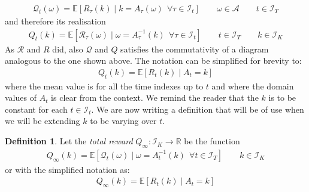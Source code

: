 \documentclass[]{scrartcl}
\theoremstyle{definition}
\newtheorem{definition}{Definition}[section]
\begin{document}
\begin{align}\label{def:mathcalQt}
\mathcal{Q}_t(\omega) = \mathbb{E} \left[ R_{\tau}(k)\mid k = A_{\tau}(\omega)~~ \forall \tau \in \mathcal{I}_t \right]
\qquad
\omega \in \mathcal{A}
\qquad
t \in \mathcal{I}_T
\end{align}
and therefore its realisation
\begin{align}\label{def:Qt}
Q_t(k) = \mathbb{E} \left[ \mathcal{R}_{\tau}(\omega)\mid \omega = A_{\tau}^{-1}(k)~~ \forall \tau \in \mathcal{I}_t \right]
\qquad
t \in \mathcal{I}_T
\qquad
k \in \mathcal{I}_K
\end{align}
As $\mathcal{R}$ and $R$ did, also $\mathcal{Q}$ and $Q$ satisfies the commutativity of a diagram analogous to the one shown above. The notation can be simplified for brevity to:
\begin{align}\label{def:mathcalQt_simple}
Q_t(k) = \mathbb{E} \left[ R_{t}(k) \mid A_{t} = k \right]
\end{align}
where the mean value is for all the time indexes up to $t$ and where the domain values of $A_t$ is clear from the context. We remind the reader that the $k$ is to be constant for each $t\in\mathcal{I}_t$. We are now writing a definition that will be of use when we will be extending $k$ to be varying over $t$.

\begin{definition}
    Let the \emph{total reward} $Q_{\infty}: \mathcal{I}_K \rightarrow \mathbb{R}$ be the function
    \begin{align}\label{def:mathcalQinf}
    Q_{\infty}(k) = \mathbb{E} \left[ \mathcal{Q}_{t}(\omega) \mid \omega = A^{-1}_{t}(k)~~ \forall t \in \mathcal{I}_T \right]
    \qquad
    k \in \mathcal{I}_K
    \end{align}
    or with the simplified notation as:
    \begin{align}\label{def:mathcalQinf_simple}
    Q_{\infty}(k) = \mathbb{E} \left[ R_{t}(k) \mid A_{t} = k \right]
    \end{align}
\end{definition}
\end{document}
